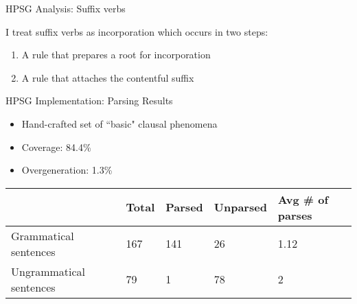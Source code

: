\begin{frame}{HPSG Analysis: Suffix verbs}

I treat suffix verbs as incorporation which occurs in two steps:

\begin{enumerate}
\item A rule that prepares a root for incorporation
\item A rule that attaches the contentful suffix	
\end{enumerate}

\centering
{}

\end{frame}

\begin{frame}{HPSG Implementation: Parsing Results}

\begin{itemize}
\item Hand-crafted set of ``basic" clausal phenomena
\item Coverage: 84.4\%
\item Overgeneration: 1.3\%
\end{itemize}

\begin{table}[]
\centering
\label{tab:clause-coverage}
\begin{tabular}{l|llll}
 & Total & Parsed & Unparsed & Avg \# of parses \\ \hline
Grammatical sentences & 167 & 141 & 26 & 1.12 \\ \hline
Ungrammatical sentences & 79 & 1 & 78 & 2
\end{tabular}
\end{table}
	
\end{frame}
